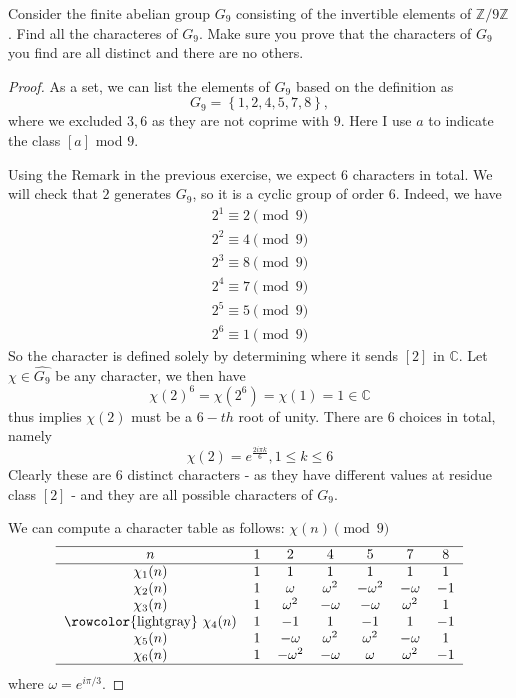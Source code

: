 \documentclass[11pt,letterpaper]{article}
\DeclareMathOperator{\1}{\mathbbm{1}}
\begin{document}
\begin{exercise}
  \label{ex3}
  Consider the finite abelian group $G_9$ consisting of the invertible elements of $\mathbb{Z}/9\mathbb{Z}$. Find all the characteres of $G_9$.
  Make sure you prove that the characters of $G_9$ you find are all distinct and there are no others.
\end{exercise}
\begin{proof}
  As a set, we can list the elements of $G_9$ based on the definition as
  \[G_9 = \left\lbrace 1,2,4,5,7,8\right\rbrace,\]
  where we excluded $3,6$ as they are not coprime with $9$. Here I use $a$ to indicate the class $[a]$ mod $9$.

  Using the Remark in the previous exercise, we expect $6$ characters in total. We will check that $2$ generates $G_9$, so it is a
  cyclic group of order $6$. Indeed, we have
  \begin{align*}
    2^1 \equiv 2 \pmod 9 \\
    2^2 \equiv 4 \pmod 9 \\
    2^3 \equiv 8 \pmod 9 \\
    2^4 \equiv 7 \pmod 9 \\
    2^5 \equiv 5 \pmod 9 \\
    2^6 \equiv 1 \pmod 9
  \end{align*}
  So the character is defined solely by determining where it sends $[2]$ in $\mathbb{C}$. Let $\chi \in \hat{G_9}$ be
  any character, we then have
  \[\chi(2)^6=\chi(2^6) = \chi(1) = 1 \in \mathbb{C}\]
  thus implies $\chi(2)$ must be a $6-th$ root of unity. There are $6$ choices in total, namely
  \[\chi(2) = e^{\frac{2i\pi k}{6}}, 1 \le k \le 6\]
  Clearly these are 6 distinct characters - as they have different values at residue class $[2]$ -  and they are all possible characters of $G_9$.

  We can compute a character table as follows:
  $\chi(n)\pmod{9}$ \\
  \[\begin{tabular}{c c c c c c c }
      \hline
      $n$         & $1$ & $2$           & $4$          & $5$           & $7$          & $8$  \\
      \hline
      $\chi_1(n)$ & $1$ & $1$           & $1$          & $1$           & $1$          & $1$  \\
      $\chi_2(n)$ & $1$ & $\omega$      & $\omega^{2}$ & $-\omega^{2}$ & $-\omega$    & $-1$ \\
      $\chi_3(n)$ & $1$ & $\omega^{2}$  & $-\omega$    & $-\omega$     & $\omega^{2}$ & $1$  \\\rowcolor{lightgray}
      $\chi_4(n)$ & $1$ & $-1$          & $1$          & $-1$          & $1$          & $-1$ \\
      $\chi_5(n)$ & $1$ & $-\omega$     & $\omega^{2}$ & $\omega^{2}$  & $-\omega$    & $1$  \\
      $\chi_6(n)$ & $1$ & $-\omega^{2}$ & $-\omega$    & $\omega$      & $\omega^{2}$ & $-1$ \\
      \hline
    \end{tabular}\]
  where  $\omega = e^{i\pi/3}$.
\end{proof}
\end{document}
